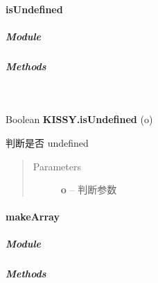 \documentclass[letterpaper,10pt,english]{sphinxmanual}
\begin{document}
\paragraph{isUndefined}
\label{api/seed/lang/isUndefined::doc}\label{api/seed/lang/isUndefined:isundefined}

\subparagraph{Module}
\label{api/seed/lang/isUndefined:module}\begin{quote}

{\hyperref[api/seed/lang/index:module-Lang]{}}
\end{quote}


\subparagraph{Methods}
\label{api/seed/lang/isUndefined:methods}

\begin{fulllineitems}
\label{api/seed/lang/isUndefined:Lang.KISSY.isUndefined}~
\begin{DUlineblock}{0em}
\item[] Boolean \textbf{KISSY.isUndefined} (o)
\item[] 判断是否 undefined
\end{DUlineblock}
\begin{quote}\begin{description}
\item[{Parameters}] \leavevmode
\textbf{o} -- 判断参数

\end{description}\end{quote}

\end{fulllineitems}



\paragraph{makeArray}
\label{api/seed/lang/makeArray:makearray}\label{api/seed/lang/makeArray::doc}

\subparagraph{Module}
\label{api/seed/lang/makeArray:module}\begin{quote}

{\hyperref[api/seed/lang/index:module-Lang]{}}
\end{quote}


\subparagraph{Methods}
\label{api/seed/lang/makeArray:methods}
\end{document}
